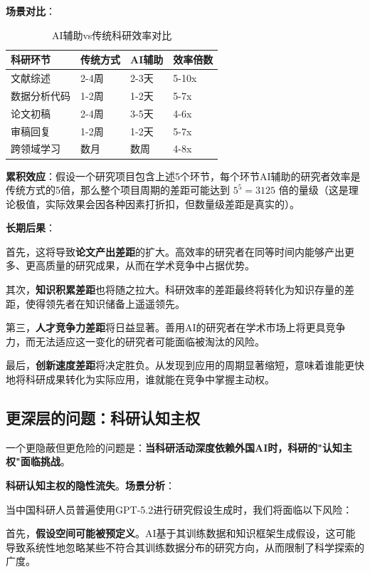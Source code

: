 \textbf{场景对比}：

\begin{table}[H]
\centering
\caption{AI辅助vs传统科研效率对比}
\small
\begin{tabular}{p{2.8cm}p{3.8cm}p{3.8cm}p{2cm}}
\toprule
\textbf{科研环节} & \textbf{传统方式} & \textbf{AI辅助} & \textbf{效率倍数} \\
\midrule
文献综述 & 2-4周 & 2-3天 & 5-10x \\
数据分析代码 & 1-2周 & 1-2天 & 5-7x \\
论文初稿 & 2-4周 & 3-5天 & 4-6x \\
审稿回复 & 1-2周 & 1-2天 & 5-7x \\
跨领域学习 & 数月 & 数周 & 4-8x \\
\bottomrule
\end{tabular}
\end{table}

\textbf{累积效应}：假设一个研究项目包含上述5个环节，每个环节AI辅助的研究者效率是传统方式的5倍，那么整个项目周期的差距可能达到 $5^5 = 3125$ 倍的量级（这是理论极值，实际效果会因各种因素打折扣，但数量级差距是真实的）。

\textbf{长期后果}：

首先，这将导致\textbf{论文产出差距}的扩大。高效率的研究者在同等时间内能够产出更多、更高质量的研究成果，从而在学术竞争中占据优势。

其次，\textbf{知识积累差距}也将随之拉大。科研效率的差距最终将转化为知识存量的差距，使得领先者在知识储备上遥遥领先。

第三，\textbf{人才竞争力差距}将日益显著。善用AI的研究者在学术市场上将更具竞争力，而无法适应这一变化的研究者可能面临被淘汰的风险。

最后，\textbf{创新速度差距}将决定胜负。从发现到应用的周期显著缩短，意味着谁能更快地将科研成果转化为实际应用，谁就能在竞争中掌握主动权。

\subsection{更深层的问题：科研认知主权}

一个更隐蔽但更危险的问题是：\textbf{当科研活动深度依赖外国AI时，科研的"认知主权"面临挑战}。

\textbf{科研认知主权的隐性流失}。\textbf{场景分析}：

当中国科研人员普遍使用GPT-5.2进行研究假设生成时，我们将面临以下风险：

首先，\textbf{假设空间可能被预定义}。AI基于其训练数据和知识框架生成假设，这可能导致系统性地忽略某些不符合其训练数据分布的研究方向，从而限制了科学探索的广度。

